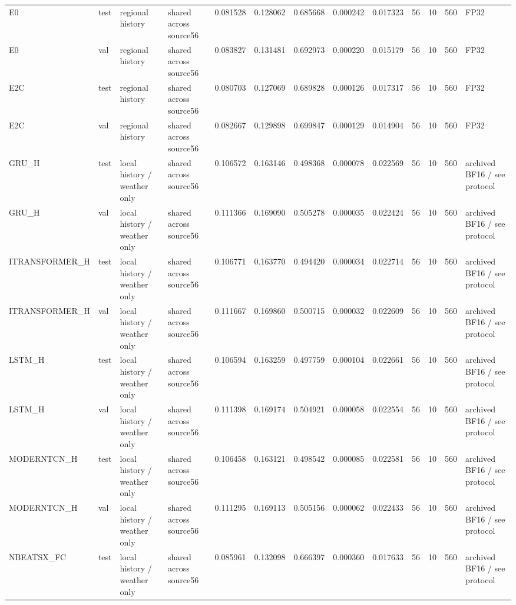 \begin{tabular}{llllrrrrrrrrl}
E0 & test & regional history & shared across source56 & 0.081528 & 0.128062 & 0.685668 & 0.000242 & 0.017323 & 56 & 10 & 560 & FP32 \\
E0 & val & regional history & shared across source56 & 0.083827 & 0.131481 & 0.692973 & 0.000220 & 0.015179 & 56 & 10 & 560 & FP32 \\
E2C & test & regional history & shared across source56 & 0.080703 & 0.127069 & 0.689828 & 0.000126 & 0.017317 & 56 & 10 & 560 & FP32 \\
E2C & val & regional history & shared across source56 & 0.082667 & 0.129898 & 0.699847 & 0.000129 & 0.014904 & 56 & 10 & 560 & FP32 \\
GRU\_H & test & local history / weather only & shared across source56 & 0.106572 & 0.163146 & 0.498368 & 0.000078 & 0.022569 & 56 & 10 & 560 & archived BF16 / see protocol \\
GRU\_H & val & local history / weather only & shared across source56 & 0.111366 & 0.169090 & 0.505278 & 0.000035 & 0.022424 & 56 & 10 & 560 & archived BF16 / see protocol \\
ITRANSFORMER\_H & test & local history / weather only & shared across source56 & 0.106771 & 0.163770 & 0.494420 & 0.000034 & 0.022714 & 56 & 10 & 560 & archived BF16 / see protocol \\
ITRANSFORMER\_H & val & local history / weather only & shared across source56 & 0.111667 & 0.169860 & 0.500715 & 0.000032 & 0.022609 & 56 & 10 & 560 & archived BF16 / see protocol \\
LSTM\_H & test & local history / weather only & shared across source56 & 0.106594 & 0.163259 & 0.497759 & 0.000104 & 0.022661 & 56 & 10 & 560 & archived BF16 / see protocol \\
LSTM\_H & val & local history / weather only & shared across source56 & 0.111398 & 0.169174 & 0.504921 & 0.000058 & 0.022554 & 56 & 10 & 560 & archived BF16 / see protocol \\
MODERNTCN\_H & test & local history / weather only & shared across source56 & 0.106458 & 0.163121 & 0.498542 & 0.000085 & 0.022581 & 56 & 10 & 560 & archived BF16 / see protocol \\
MODERNTCN\_H & val & local history / weather only & shared across source56 & 0.111295 & 0.169113 & 0.505156 & 0.000062 & 0.022433 & 56 & 10 & 560 & archived BF16 / see protocol \\
NBEATSX\_FC & test & local history / weather only & shared across source56 & 0.085961 & 0.132098 & 0.666397 & 0.000360 & 0.017633 & 56 & 10 & 560 & archived BF16 / see protocol \\

\end{tabular}
